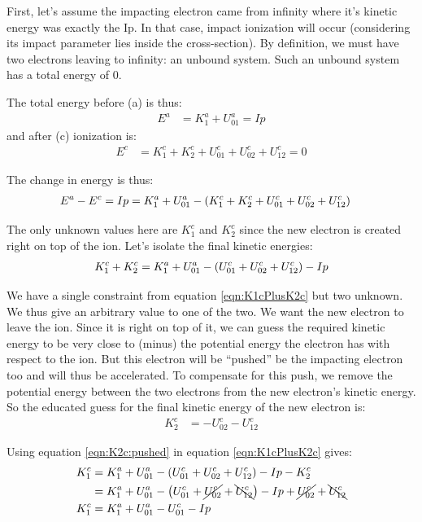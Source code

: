 First, let's assume the impacting electron came from infinity where it's kinetic
energy was exactly the Ip. In that case, impact ionization will occur (considering
its impact parameter lies inside the cross-section). By definition, we must have two
electrons leaving to infinity: an unbound system. Such an unbound system has a total
energy of 0.

The total energy before (a) is thus:
\begin{align}
E^{a} & = K_{1}^{a} + U_{01}^{a} = Ip
\label{eqn:Ea}
\end{align}
and after (c) ionization is:
\begin{align}
E^{c} & = K_{1}^{c} + K_{2}^{c} + U_{01}^{c} + U_{02}^{c} + U_{12}^{c} = 0
\label{eqn:Ec}
\end{align}

The change in energy is thus:
\begin{align}
E^{a} - E^{c} & = Ip = K_{1}^{a} + U_{01}^{a} - \left( 
    K_{1}^{c} + K_{2}^{c} + U_{01}^{c} + U_{02}^{c} + U_{12}^{c}
 \right)
\end{align}

The only unknown values here are $K_{1}^{c}$ and $K_{2}^{c}$ since the new electron is
created right on top of the ion. Let's isolate the final kinetic energies:
\begin{align}
K_{1}^{c} + K_{2}^{c} = K_{1}^{a} + U_{01}^{a} - \left( 
    U_{01}^{c} + U_{02}^{c} + U_{12}^{c}
 \right) - Ip
\label{eqn:K1cPlusK2c}
\end{align}

We have a single constraint from equation \eqref{eqn:K1cPlusK2c} but two unknown. We thus
give an arbitrary value to one of the two. We want the new electron to leave the ion.
Since it is right on top of it, we can guess the required kinetic energy to be very close
to (minus) the potential energy the electron has with respect to the ion. But this electron
will be ``pushed'' be the impacting electron too and will thus be accelerated. To compensate
for this push, we remove the potential energy between the two electrons from the new electron's
kinetic energy. So the educated guess for the final kinetic energy of the new electron is:
\begin{align}
K_{2}^{c} & = -U_{02}^{c} - U_{12}^{c}
\label{eqn:K2c:pushed}
\end{align}

Using equation \eqref{eqn:K2c:pushed} in equation \eqref{eqn:K1cPlusK2c} gives:
\begin{align}
K_{1}^{c}
 & = K_{1}^{a} + U_{01}^{a} - \left( 
    U_{01}^{c} + U_{02}^{c} + U_{12}^{c}
 \right) - Ip - K_{2}^{c} \\
 & = K_{1}^{a} + U_{01}^{a} - \left( 
    U_{01}^{c} + \cancel{ U_{02}^{c} } + \bcancel{ U_{12}^{c} }
 \right) - Ip + \cancel{ U_{02}^{c} } + \bcancel{ U_{12}^{c} } \\
K_{1}^{c}
 & = K_{1}^{a} + U_{01}^{a} - U_{01}^{c} - Ip
\label{eqn:K1c:pushed}
\end{align}

